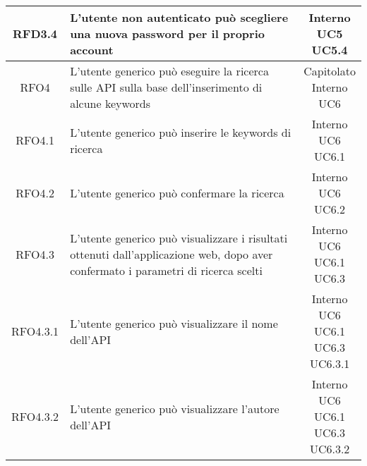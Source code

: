 \begin{longtable}{|c|p{8cm}|c|}
\hline
\hypertarget{RFD3.4}{RFD3.4} & L'utente non autenticato può scegliere una nuova password per il proprio account & \makecell*{Interno\\UC5\\UC5.4} \\
\hline

\hypertarget{RFO4}{RFO4} & L'utente generico può eseguire la ricerca sulle API sulla base dell'inserimento di alcune keywords & \makecell*{Capitolato\\Interno\\UC6} \\
\hline

\hypertarget{RFO4.1}{RFO4.1} & L'utente generico può inserire le keywords di ricerca & \makecell*{Interno\\UC6\\UC6.1} \\
\hline
\hypertarget{RFO4.2}{RFO4.2} & L'utente generico può confermare la ricerca  & \makecell*{Interno\\UC6\\UC6.2} \\
\hline

\hypertarget{RFO4.3}{RFO4.3} & L'utente generico può visualizzare i risultati ottenuti dall'applicazione web, dopo aver confermato i parametri di ricerca scelti & \makecell*{Interno\\UC6\\UC6.1\\UC6.3} \\
\hline
\hypertarget{RFO4.3.1}{RFO4.3.1} & L'utente generico può visualizzare il nome dell'API & \makecell*{Interno\\UC6\\UC6.1\\UC6.3\\UC6.3.1} \\
\hline
\hypertarget{RFO4.3.2}{RFO4.3.2} & L'utente generico può visualizzare l'autore dell'API & \makecell*{Interno\\UC6\\UC6.1\\UC6.3\\UC6.3.2} \\
\hline


\end{longtable}
